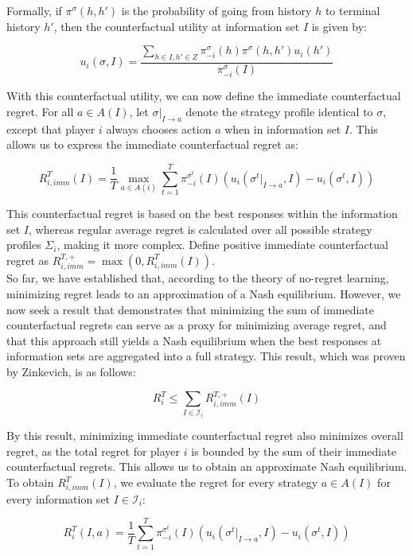 \documentclass{article}
\begin{document}
Formally, if $\pi ^{\sigma}(h, h')$ is the probability of going from history $h$ to terminal history $h'$, then the counterfactual utility at information set $I$ is given by:

\[ u_i(\sigma, I) = \frac{\sum_{h \in I, h' \in Z} \pi_{-i}^{\sigma}(h) \pi^{\sigma}(h, h')u_i(h')}{\pi_{-i}^{\sigma}(I)} \]

With this counterfactual utility, we can now define the immediate counterfactual regret. For all \( a \in A(I) \), let \( \sigma|_{I \rightarrow a} \) denote the strategy profile identical to \( \sigma \), except that player \( i \) always chooses action \( a \) when in information set \( I \). This allows us to express the immediate counterfactual regret as:

\[
R_{i, imm}^T(I) = \frac{1}{T} \max_{a \in A(i)} \sum_{t=1}^T \pi_{-i}^{\sigma^t}(I)(u_i(\sigma^t|_{I \rightarrow a}, I) - u_i(\sigma^t, I)) 
\]

This counterfactual regret is based on the best responses within the information set \( I \), whereas regular average regret is calculated over all possible strategy profiles \( \Sigma_i \), making it more complex. Define positive immediate counterfactual regret as $R_{i,imm}^{T,+} = \max(0, R_{i,imm}^T(I))$. \\


So far, we have established that, according to the theory of no-regret learning, minimizing regret leads to an approximation of a Nash equilibrium. However, we now seek a result that demonstrates that minimizing the sum of immediate counterfactual regrets can serve as a proxy for minimizing average regret, and that this approach still yields a Nash equilibrium when the best responses at information sets are aggregated into a full strategy. This result, which was proven by Zinkevich, is as follows:

\[ R^T_i \leq \sum_{I \in \mathcal{I}_i} R_{i,imm}^{T,+}(I) \]

By this result, minimizing immediate counterfactual regret also minimizes overall regret, as the total regret for player $i$ is bounded by the sum of their immediate counterfactual regrets. This allows us to obtain an approximate Nash equilibrium. \\

To obtain $R_{i, imm}^T(I)$, we evaluate the regret for every strategy $a \in A(I)$ for every information set $I \in \mathcal{I}_i$:

\[ 
R^T_i(I,a) = \frac{1}{T} \sum_{t=1}^T \pi_{-i}^{\sigma^t}(I)(u_i(\sigma^t|_{I \rightarrow a}, I) - u_i(\sigma^t, I)) 
\]
\end{document}
